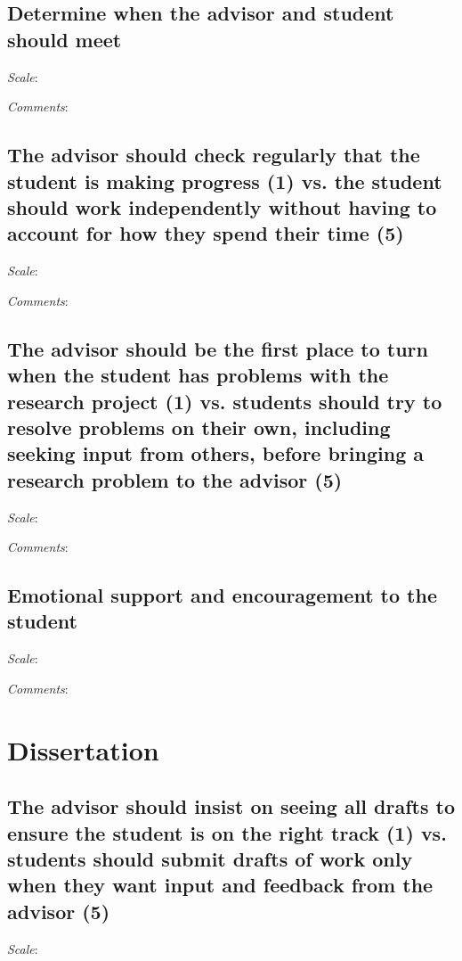 \documentclass[10pt]{article}
\begin{document}
\subsection*{Determine when the advisor and student should meet}
\textit{Scale}: %

\textit{Comments}: %

\subsection*{The advisor should check regularly that the student is making
             progress (1) vs. the student should work independently without
             having to account for how they spend their time (5)}
\textit{Scale}: %

\textit{Comments}: %

\subsection*{The advisor should be the first place to turn when the student
             has problems with the research project (1) vs. students should
             try to resolve problems on their own, including seeking input
             from others, before bringing a research problem to the advisor
             (5)}
\textit{Scale}: %

\textit{Comments}: %

\subsection*{Emotional support and encouragement to the student}
\textit{Scale}: %

\textit{Comments}: %


\section*{Dissertation}
\subsection*{The advisor should insist on seeing all drafts to ensure the
             student is on the right track (1) vs. students should submit
             drafts of work only when they want input and feedback from the
             advisor (5)}
\textit{Scale}: %
\end{document}
